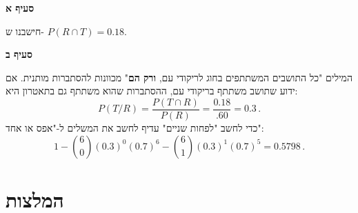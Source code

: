 \textbf{סעיף א}

חישבנו ש-%
$P(R\cap T)=0.18$.

\medskip

\textbf{סעיף ב}

המילים "כל התושבים המשתתפים בחוג לריקודי עם,
\textbf{ורק הם}"
מכוונות להסתברות מותנית. אם ידוע שתושב משתתף בריקודי עם, ההסתברות שהוא משתתף גם בתאטרון היא:
\[
P(T/R) = \frac{P(T\cap R)}{P(R)}= \frac{0.18}{.60} = 0.3\,.
\]
כדי לחשב "לפחות שניים" עדיף לחשב את המשלים ל-"אפס או אחד":
\[
1-{6\choose 0}(0.3)^0(0.7)^6 -{6\choose 1}(0.3)^1(0.7)^5=0.5798\,.
\]


\np
\section{המלצות}

